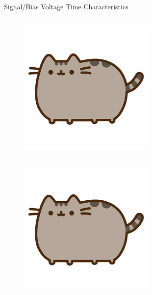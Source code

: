 \begin{columnframe}{Signal/Bias Voltage Time Characteristics}
    \begin{column}{0.5\textwidth}
        \begin{figure}
            \centering
            \includegraphics[width=0.6\textwidth, frame]{images/pusheen.png}
        \end{figure}
    \end{column}
    \begin{column}{0.5\textwidth}
        \begin{figure}
            \centering
            \includegraphics[width=0.6\textwidth, frame]{images/pusheen.png}
        \end{figure}
    \end{column}
\end{columnframe}

